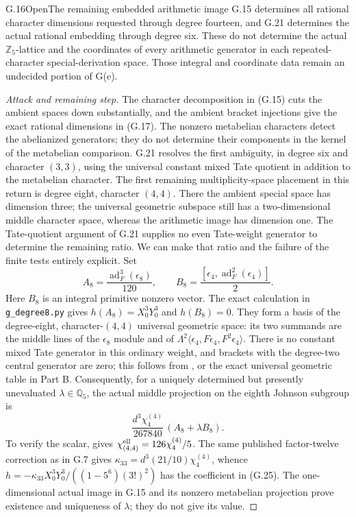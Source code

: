 \begin{statement}{G.16}{Open}{The remaining embedded arithmetic image}
G.15 determines all rational character dimensions requested
through degree fourteen, and G.21 determines the actual rational
embedding through degree six. These do not determine the actual
$\mathbb Z_5$-lattice and the coordinates of every arithmetic
generator in each repeated-character special-derivation
space. Those integral and coordinate data remain an
undecided portion of G(e).
\end{statement}
\begin{proof}[Attack and remaining step]
The character decomposition in (G.15) cuts the ambient spaces
down substantially, and the ambient bracket injections
give the exact rational dimensions in (G.17). The nonzero
metabelian characters detect the abelianized generators;
they do not determine their components
in the kernel of the metabelian comparison. G.21 resolves the
first ambiguity, in degree six and character $(3,3)$, using the
universal constant mixed Tate quotient in addition to the
metabelian character. The first remaining multiplicity-space
placement in this return is degree eight, character $(4,4)$.
There the ambient special space has dimension three; the
universal geometric subspace still has a two-dimensional middle
character space, whereas the arithmetic image has dimension one.
The Tate-quotient argument of G.21 supplies no even Tate-weight
generator to determine the remaining ratio. We can make that ratio
and the failure of the finite tests entirely explicit. Set
\[
 A_8=\frac{\operatorname{ad}_F^3(\epsilon_8)}{120},
 \qquad
 B_8=\frac{[\epsilon_4,\operatorname{ad}_F^2(\epsilon_4)]}{2}.
 \tag{G.24}
\]
Here $B_8$ is an integral primitive nonzero vector. The exact
calculation in \texttt{g\_degree8.py} gives
$h(A_8)=X_0^3Y_0^3$ and $h(B_8)=0$. They form a basis of the
degree-eight, character-$(4,4)$ universal geometric space: its
two summands are the middle lines of the $\epsilon_8$ module and
of $\Lambda^2\langle\epsilon_4,F\epsilon_4,F^2\epsilon_4\rangle$.
There is no constant mixed Tate generator in this ordinary
weight, and brackets with the degree-two central generator are
zero; this follows from \citet[Proposition 20.1 and
\S22]{HainMatsumoto2020}, or the exact universal geometric table
in Part B. Consequently, for a uniquely determined but presently
unevaluated $\lambda\in\mathbb Q_5$, the actual middle projection
on the eighth Johnson subgroup is
\[
 \frac{d^3\chi^{(4)}_4}{267840}\,(A_8+\lambda B_8).
 \tag{G.25}
\]
To verify the scalar, \citet[Theorem 1.7]{IshiiGoto2026} gives
$\chi^{\rm ell}_{(4,4)}=126\chi^{(4)}_4/5$.
The same published factor-twelve correction as in G.7 gives
$\kappa_{33}=d^3(21/10)\chi^{(4)}_4$, whence
$h=-\kappa_{33}X_0^3Y_0^3/((1-5^6)(3!)^2)$ has the coefficient
in (G.25). The one-dimensional actual image in G.15 and its
nonzero metabelian projection prove existence and uniqueness of
$\lambda$; they do not give its value.


\end{proof}
